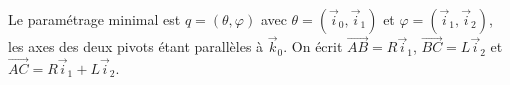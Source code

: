\begin{corrigebox}
Le paramétrage minimal est $q=(\theta,\varphi)$ avec
$\theta=(\vec i_0,\vec i_1)$ et $\varphi=(\vec i_1,\vec i_2)$, les axes des
deux pivots étant parallèles à $\vec k_0$. On écrit
$\overrightarrow{AB}=R\vec i_1$, $\overrightarrow{BC}=L\vec i_2$ et
$\overrightarrow{AC}=R\vec i_1+L\vec i_2$.
\end{corrigebox}
